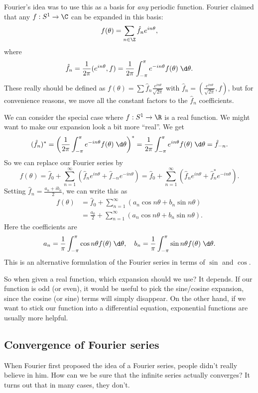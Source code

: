 \documentclass[a4paper]{article}
\begin{document}
Fourier's idea was to use this as a basis for \emph{any} periodic function. Fourier claimed that any $f: S^1 \to \C$ can be expanded in this basis:
\[
  f(\theta) = \sum_{n \in \Z}\hat{f}_n e^{in\theta},
\]
where
\[
  \hat{f}_n = \frac{1}{2\pi} (e^{in\theta}, f) = \frac{1}{2\pi}\int_{-\pi}^\pi e^{-in\theta} f(\theta)\;\d \theta.
\]
These really should be defined as $f(\theta) = \sum \hat{f}_n \frac{e^{in\theta}}{\sqrt{2\pi}}$ with $\hat{f}_n = \left(\frac{e^{in\theta}}{\sqrt{2\pi}}, f\right)$, but for convenience reasons, we move all the constant factors to the $\hat{f}_n$ coefficients.

We can consider the special case where $f: S^1 \to \R$ is a real function. We might want to make our expansion look a bit more ``real''. We get
\[
  (\hat{f}_n)^* = \left(\frac{1}{2\pi}\int_{-\pi}^\pi e^{-in\theta}f(\theta)\;\d \theta\right)^* = \frac{1}{2\pi}\int_{-\pi}^{\pi}e^{in\theta}f(\theta)\;\d \theta = \hat{f}_{-n}.
\]
So we can replace our Fourier series by
\[
  f(\theta) = \hat{f}_0 + \sum_{n = 1}^\infty\left(\hat{f}_n e^{in\theta} + \hat{f}_{-n}e^{-in\theta}\right) = \hat{f}_0 + \sum_{n = 1}^\infty \left(\hat{f}_n e^{in\theta} + \hat{f}_n^* e^{-in\theta}\right).
\]
Setting $\displaystyle \hat{f}_n = \frac{a_n + ib_n}{2}$, we can write this as
\begin{align*}
  f(\theta) &= \hat{f}_0 + \sum_{n = 1}^\infty (a_n \cos n\theta + b_n \sin n\theta)\\
  &= \frac{a_0}{2} + \sum_{n = 1}^\infty (a_n \cos n\theta + b_n \sin n\theta).
\end{align*}
Here the coefficients are
\[
  a_n = \frac{1}{\pi}\int_{-\pi}^\pi \cos n\theta f(\theta) \;\d \theta,\quad b_n = \frac{1}{\pi}\int_{-\pi}^\pi \sin n\theta f(\theta) \;\d \theta.
\]
This is an alternative formulation of the Fourier series in terms of $\sin$ and $\cos$.

So when given a real function, which expansion should we use? It depends. If our function is odd (or even), it would be useful to pick the sine/cosine expansion, since the cosine (or sine) terms will simply disappear. On the other hand, if we want to stick our function into a differential equation, exponential functions are usually more helpful.

\subsection{Convergence of Fourier series}
When Fourier first proposed the idea of a Fourier series, people didn't really believe in him. How can we be sure that the infinite series actually converges? It turns out that in many cases, they don't.
\end{document}
